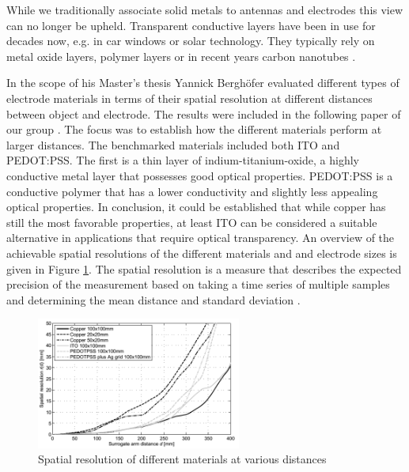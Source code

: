 While we traditionally associate solid metals to antennas and electrodes this view can no longer be upheld. Transparent conductive layers have been in use for decades now, e.g. in car windows or solar technology. They typically rely on metal oxide layers, polymer layers or in recent years carbon nanotubes \cite{Moon2005}. 

In the scope of his Master's thesis Yannick Berghöfer evaluated different types of electrode materials in terms of their spatial resolution at different distances between object and electrode. The results were included in the following paper of our group \cite{grosse2013opencapsense}. The focus was to establish how the different materials perform at larger distances. The benchmarked materials included both ITO and PEDOT:PSS. The first is a thin layer of indium-titanium-oxide, a highly conductive metal layer that possesses good optical properties. PEDOT:PSS is a conductive polymer that has a lower conductivity and slightly less appealing optical properties. In conclusion, it could be established that while copper has still the most favorable properties, at least ITO can be considered a suitable alternative in applications that require optical transparency. An overview of the achievable spatial resolutions of the different materials and and electrode sizes is given in Figure \ref{fig:cap_spatial_resolution}.  The spatial resolution is a measure that describes the expected precision of the measurement based on taking a time series of multiple samples and determining the mean distance and standard deviation \cite{grosse2013opencapsense}.

\begin{figure} [h]
\centering
\includegraphics[width=0.6\textwidth]{images/cap_spatial_resolution.png} 
\caption{Spatial resolution of different materials at various distances \cite{grosse2013opencapsense}}
\label{fig:cap_spatial_resolution}
\end{figure}

